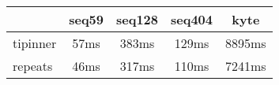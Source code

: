 \begin{tabular}{|l|c|c|c|c|}
\hline
 & seq59 & seq128 & seq404  & kyte \\
\hline
tipinner &  57ms &  383ms &  129ms &  8895ms\\
\hline
repeats &  46ms &  317ms &  110ms &  7241ms\\
\hline
\end{tabular}
